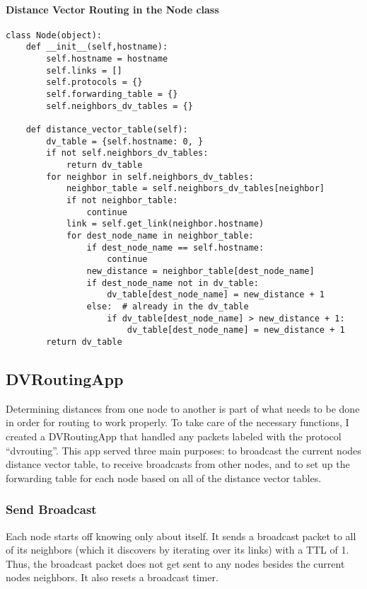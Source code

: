 \documentclass[11pt]{article}
\begin{document}
\paragraph{Distance Vector Routing in the Node class} \hspace{2mm}
\begin{lstlisting}
class Node(object):
    def __init__(self,hostname):
        self.hostname = hostname
        self.links = []
        self.protocols = {}
        self.forwarding_table = {}
        self.neighbors_dv_tables = {}

    def distance_vector_table(self):
        dv_table = {self.hostname: 0, }
        if not self.neighbors_dv_tables:
            return dv_table
        for neighbor in self.neighbors_dv_tables:
            neighbor_table = self.neighbors_dv_tables[neighbor]
            if not neighbor_table:
                continue
            link = self.get_link(neighbor.hostname)
            for dest_node_name in neighbor_table:
                if dest_node_name == self.hostname:
                    continue
                new_distance = neighbor_table[dest_node_name]
                if dest_node_name not in dv_table:
                    dv_table[dest_node_name] = new_distance + 1
                else:  # already in the dv_table
                    if dv_table[dest_node_name] > new_distance + 1:
                        dv_table[dest_node_name] = new_distance + 1
        return dv_table
\end{lstlisting}

\subsection{DVRoutingApp}
Determining distances from one node to another is part of what needs to be done in order for routing to work properly. To take care of the necessary functions, I created a DVRoutingApp that handled any packets labeled with the protocol ``dvrouting''. This app served three main purposes: to broadcast the current nodes distance vector table, to receive broadcasts from other nodes, and to set up the forwarding table for each node based on all of the distance vector tables.

\subsubsection{Send Broadcast}
Each node starts off knowing only about itself. It sends a broadcast packet to all of its neighbors (which it discovers by iterating over its links) with a TTL of 1. Thus, the broadcast packet does not get sent to any nodes besides the current nodes neighbors. It also resets a broadcast timer.
\end{document}
